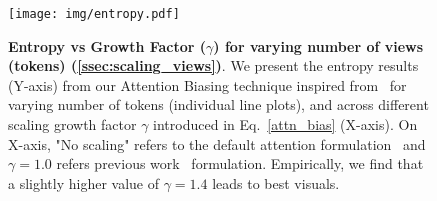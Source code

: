 \begin{figure}[h!]
    \centering    
    \texttt{[image: img/entropy.pdf]}
    \vspace{-0.2cm}
    \caption{{\textbf{Entropy vs Growth Factor ($\gamma$) for varying number of views (tokens) (\cref{ssec:scaling_views})}. We present the entropy results (Y-axis) from our Attention Biasing technique inspired from~\cite{jin2023training} for varying number of tokens (individual line plots), and across different scaling growth factor $\gamma$ introduced in Eq.~\eqref{attn_bias} (X-axis). On X-axis, "No scaling" refers to the default attention formulation~\cite{vaswani2017attention} and $\gamma=1.0$ refers previous work~\cite{jin2023training} formulation. Empirically, we find that a slightly higher value of $\gamma=1.4$  leads to best visuals.}}
    \label{fig:entropy}
\end{figure}

